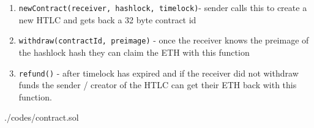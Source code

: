 \begin{enumerate}
	\item \texttt{newContract(receiver, hashlock, timelock)}- sender calls this to create a new HTLC and gets back a 32 byte contract id
	\item \texttt{withdraw(contractId, preimage)} - once the receiver knows the preimage of the hashlock hash they can claim the ETH with this function
	\item \texttt{refund()} - after timelock has expired and if the receiver did not withdraw funds the sender / creator of the HTLC can get their ETH back with this function.
\end{enumerate}
\hfill

\begin{lstinputlisting}[language=Solidity, 
						firstline=11, 
						lastline=68, 
						caption= Ethereum micro-payment channel structure -- Machinomy]{./codes/contract.sol}
	
\end{lstinputlisting}



